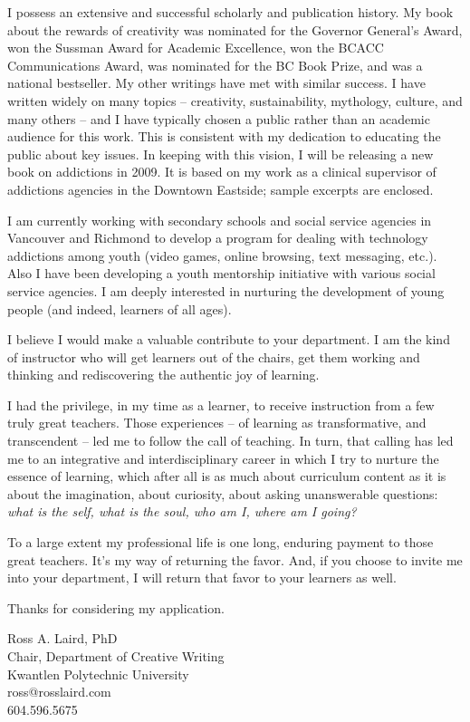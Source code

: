 \documentclass[10pt,DIV09,letterpaper,oneside,headsepline]{scrreprt}
\begin{document}
I possess an extensive and successful scholarly and publication history. My book about the rewards of creativity was nominated for the Governor General's Award, won the Sussman Award for Academic Excellence, won the BCACC Communications Award, was nominated for the BC Book Prize, and was a national bestseller. My other writings have met with similar success. I have written widely on many topics -- creativity, sustainability, mythology, culture, and many others -- and I have typically chosen a public rather than an academic audience for this work. This is consistent with my dedication to educating the public about key issues. In keeping with this vision, I will be releasing a new book on addictions in 2009. It is based on my work as a clinical supervisor of addictions agencies in the Downtown Eastside; sample excerpts are enclosed.

I am currently working with secondary schools and social service agencies in Vancouver and Richmond to develop a program for dealing with technology addictions among youth (video games, online browsing, text messaging, etc.). Also I have been developing a youth mentorship initiative with various social service agencies. I am deeply interested in nurturing the development of young people (and indeed, learners of all ages). 

I believe I would make a valuable contribute to your department. I am the kind of instructor who will get learners out of the chairs, get them working and thinking and rediscovering the authentic joy of learning.

I had the privilege, in my time as a learner, to receive instruction from a few truly great teachers. Those experiences -- of learning as transformative, and transcendent -- led me to follow the call of teaching. In turn, that calling has led me to an integrative and interdisciplinary career in which I try to nurture the essence of learning, which after all is as much about curriculum content as it is about the imagination, about curiosity, about asking unanswerable questions: \textit{what is the self, what is the soul, who am I, where am I going?}

To a large extent my professional life is one long, enduring payment to those great teachers. It's my way of returning the favor. And, if you choose to invite me into your department, I will return that favor to your learners as well.

Thanks for considering my application.

\vspace{.10in}
\begin{flushleft}
Ross A. Laird, PhD\\
Chair, Department of Creative Writing\\
Kwantlen Polytechnic University\\
ross@rosslaird.com\\
604.596.5675
\end{flushleft}
\end{document}
